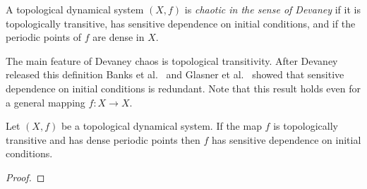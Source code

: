 \begin{defn}  \label{defn:devaney-chaos}
    A topological dynamical system $(X, f)$ is \emph{chaotic in the sense of Devaney} if it is topologically transitive, has sensitive dependence on initial conditions, and if the periodic points of $f$ are dense in $X$.
\end{defn}

The main feature of Devaney chaos is topological transitivity. After Devaney released this definition Banks et al.\ \cite{bbcds} and Glasner et al.\ \cite{glasner-weiss} showed that sensitive dependence on initial conditions is redundant. Note that this result holds even for a general mapping $f: X \to X$.

\begin{prop} \label{prop:transitivity-dense-periodic-implies-sdic}
    Let $(X, f)$ be a topological dynamical system. If the map $f$ is topologically transitive and has dense periodic points then $f$ has sensitive dependence on initial conditions.
    \begin{proof}

\end{proof}
\end{prop}
